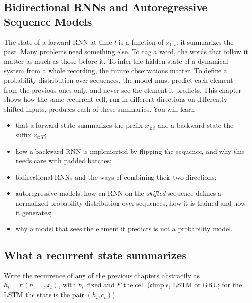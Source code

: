 \begin{notechapter}
\chapter{Bidirectional RNNs and Autoregressive Sequence Models}\label{ch:sequence-models}

\begin{chapterintro}
The state of a forward RNN at time $t$ is a function of $x_{1:t}$: it summarizes the past. Many
problems need something else. To tag a word, the words that follow it matter as much as
those before it. To infer the hidden state of a dynamical system from a whole recording, the
future observations matter. To define a probability distribution over sequences, the
model must predict each element from the previous ones only, and never see the element it
predicts. This chapter shows how the same recurrent cell, run in different directions on
differently shifted inputs, produces each of these summaries. You will learn
\begin{itemize}[nosep]
  \item that a forward state summarizes the prefix $x_{1:t}$ and a backward state the suffix $x_{t:T}$;
  \item how a backward RNN is implemented by flipping the sequence, and why this needs care
        with padded batches;
  \item bidirectional RNNs and the ways of combining their two directions;
  \item autoregressive models: how an RNN on the \emph{shifted} sequence defines a normalized
        probability distribution over sequences, how it is trained and how it generates;
  \item why a model that sees the element it predicts is not a probability model.
\end{itemize}
\end{chapterintro}

\section{What a recurrent state summarizes}\label{sequence-models:sec:summaries}

Write the recurrence of any of the previous chapters abstractly as $h_t = F(h_{t-1}, x_t)$, with
$h_0$ fixed and $F$ the cell (simple, LSTM or GRU; for the LSTM the state is the pair $(h_t, c_t)$).


\end{notechapter}
